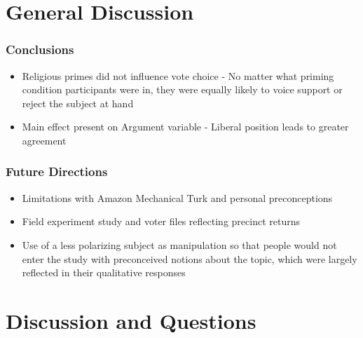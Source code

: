 \documentclass[14pt]{beamer}
\begin{document}
\section{General Discussion}

\begin{frame}
\frametitle{Conclusions}
\begin{itemize}
	\item Religious primes did not influence vote choice - No matter what priming condition participants were in, they were equally likely to voice support or reject the subject at hand
	\item Main effect present on Argument variable - Liberal position leads to greater agreement 
\end{itemize}
\end{frame}

\begin{frame}
\frametitle{Future Directions}
\begin{itemize}
	\item Limitations with Amazon Mechanical Turk and personal preconceptions
	\item Field experiment study and voter files reflecting precinct returns
	\item Use of a less polarizing subject as manipulation so that people would not enter the study with preconceived notions about the topic, which were largely reflected in their qualitative responses
\end{itemize}
\end{frame}

\section{Discussion and Questions}
\end{document}
